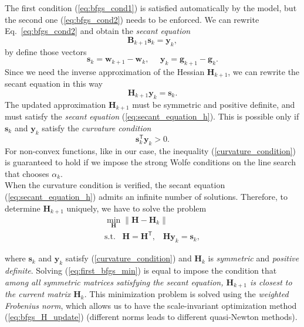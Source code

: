 \documentclass[11pt]{article}
\newcommand{\norm}[1]{\left\lVert#1\right\rVert}
\begin{document}
The first condition (\ref{eq:bfgs_cond1}) is satisfied automatically by the model, but the second one (\ref{eq:bfgs_cond2}) needs to be enforced. We can rewrite Eq.~\ref{eq:bfgs_cond2} and obtain the \textit{secant equation} 
\begin{equation}
    \mathbf{B}_{k+1} \mathbf{s}_k = \mathbf{y}_k,
\end{equation}
by define those vectors
\begin{equation}
    \mathbf{s}_k = \mathbf{w}_{k+1} - \mathbf{w}_k, \,\,\,\,\,\,\,\, \mathbf{y}_k = \mathbf{g}_{k+1} - \mathbf{g}_k.
    \label{}
\end{equation}
Since we need the inverse approximation of the Hessian $\mathbf{H}_{k+1}$, we can rewrite the secant equation in this way 
\begin{equation}
    \mathbf{H}_{k+1} \mathbf{y}_k = \mathbf{s}_k.
    \label{eq:secant_equation_h}
\end{equation}
The updated approximation $\mathbf{H}_{k+1}$ must be symmetric and positive definite, and must satisfy the \emph{secant equation} (\ref{eq:secant_equation_h}). This is possible only if $\mathbf{s}_k$ and $\mathbf{y}_k$ satisfy the \emph{curvature condition}
\begin{equation}
    \mathbf{s}_k^\mathsf{T}\mathbf{y}_k > 0.
    \label{curvature_condition}
\end{equation}
For non-convex functions, like in our case, the inequality (\ref{curvature_condition}) is guaranteed to hold if we impose the strong Wolfe conditions on the line search that chooses $\alpha_k$.\\

When the curvature condition is verified, the secant equation (\ref{eq:secant_equation_h}) admits an infinite number of solutions. Therefore, to determine $\mathbf{H}_{k+1}$ uniquely, we have to solve the problem
\begin{subequations}
\begin{gather}
\min_{\mathbf{H}} \norm{\mathbf{H} - \mathbf{H}_k} \label{eq:first_bfgs_min}\\
\text{s.t.} \; \; \; \mathbf{H} = \mathbf{H}^\mathsf{T}, \;\;\; \mathbf{H}\mathbf{y}_k = \mathbf{s}_k,\label{eq:second_bfgs_min}
\end{gather}
\end{subequations}

where $\mathbf{s}_k$ and $\mathbf{y}_k$ satisfy (\ref{curvature_condition}) and $\mathbf{H}_k$ is \emph{symmetric} and \emph{positive definite}. Solving (\ref{eq:first_bfgs_min}) is equal to impose the condition that \emph{among all symmetric matrices satisfying the secant equation, $\mathbf{H}_{k+1}$ is closest to the current matrix $\mathbf{H}_k$}. This minimization problem is solved using the \emph{weighted Frobenius norm}, which allows us to have the scale-invariant optimization method (\ref{eq:bfgs_H_update}) (different norms leads to different quasi-Newton methods).\\
\end{document}
